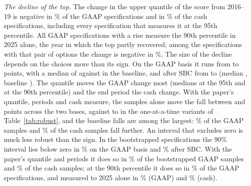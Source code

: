 

\emph{The decline of the top.} The change in the upper quantile of the score from 2016--19 is negative in \ScTopOpShare\% of the \ScTopOpN{} GAAP specifications and in \ScTopCashShare\% of the \ScTopCashN{} cash specifications, including every specification that measures it at the 95th percentile. All \ScTopOpFailN{} GAAP specifications with a rise measure the 90th percentile in 2025 alone, the year in which the top partly recovered; among the specifications with that pair of options the change is negative in \ScTopOpPNinetyLastShare\%. The size of the decline depends on the choices more than its sign. On the GAAP basis it runs from \ScTopOpMin{} to \ScTopOpMax{} points, with a median of \ScTopOpMed{} against \ScTopOpBase{} in the baseline, and after SBC from \ScTopCashMin{} to \ScTopCashMax{} (median \ScTopCashMed, baseline \ScTopCashBase). The quantile moves the GAAP change most (medians \ScTopOpQNinetyFiveMed{} at the 95th and \ScTopOpQNinetyMed{} at the 90th percentile) and the end period the cash change. With the paper's quantile, periods and cash measure, the samples alone move the fall between \ScTopCoreFallLo{} and \ScTopCoreFallHi{} points across the two bases, against \TopFallAllLo{} to \TopFallAllHi{} in the one-at-a-time variants of Table~\ref{tab:robust}, and the baseline falls are among the largest: \ScTopOpCoreBelowBase\% of the GAAP samples and \ScTopCashCoreBelowBase\% of the cash samples fall further. An interval that excludes zero is much less robust than the sign. In the bootstrapped specifications the 90\% interval lies below zero in \ScTopOpBootShare\% on the GAAP basis and \ScTopCashBootShare\% after SBC. With the paper's quantile and periods it does so in \ScTopOpBootCoreShare\% of the bootstrapped GAAP samples and \ScTopCashBootCoreShare\% of the cash samples; at the 90th percentile it does so in \ScTopOpBootPNinetyShare\% of the GAAP specifications, and measured to 2025 alone in \ScTopOpBootLastShare\% (GAAP) and \ScTopCashBootLastShare\% (cash).

